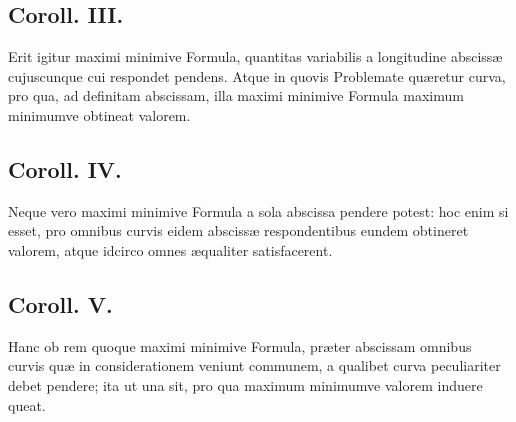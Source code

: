 \subsection*{Coroll. III.}
Erit igitur maximi minimive Formula, quantitas variabilis a longitudine abscissæ cujuscunque cui respondet pendens. Atque in quovis Problemate quæretur curva, pro qua, ad definitam abscissam, illa maximi minimive Formula maximum minimumve obtineat valorem.

\subsection*{Coroll. IV.}
Neque vero maximi minimive Formula a sola abscissa pendere potest: hoc enim si esset, pro omnibus curvis eidem abscissæ respondentibus eundem obtineret valorem, atque idcirco omnes æqualiter satisfacerent.

\subsection*{Coroll. V.}
Hanc ob rem quoque maximi minimive Formula, præter abscissam omnibus curvis quæ in considerationem veniunt communem, a qualibet curva peculiariter debet pendere; ita ut una sit, pro qua maximum minimumve valorem induere queat.

